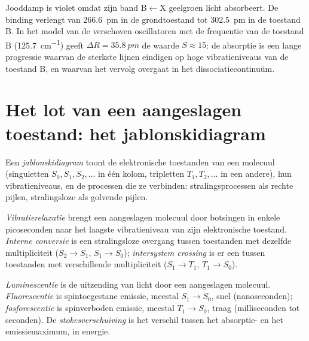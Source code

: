 \begin{example}[Jood]\label{ex:b3:electronic-spectroscopy:iodine}
Jooddamp is violet omdat zijn band B$\leftarrow$X geelgroen licht absorbeert.
De binding verlengt van \qty{266.6}{pm} in de grondtoestand tot \qty{302.5}{pm} in
de toestand B. In het model van de verschoven oscillatoren met de
frequentie van de toestand B
(\qty{125.7}{cm^{-1}}) geeft $\Delta R = \qty{35.8}{pm}$ de waarde $S \approx 15$: de absorptie is een
lange progressie waarvan de sterkste lijnen eindigen op hoge
vibratieniveaus van de toestand B, en waarvan het vervolg overgaat in het
dissociatiecontinuüm.
\end{example}

\section{Het lot van een aangeslagen toestand: het jablonskidiagram}

\begin{definition}[Jablonskidiagram]\label{def:b3:electronic-spectroscopy:jablonski}
Een \emph{jablonskidiagram} toont de elektronische
toestanden van een molecuul (singuletten $S_0, S_1, S_2, \dots$ in één kolom,
tripletten $T_1, T_2,
\dots$ in een andere), hun vibratieniveaus, en de processen die ze
verbinden: stralingsprocessen als rechte pijlen, stralingsloze als
golvende pijlen.
\end{definition}

\begin{definition}\label{def:b3:electronic-spectroscopy:radiationless}
\emph{Vibratierelaxatie} brengt een aangeslagen
molecuul door botsingen in enkele picoseconden naar het laagste
vibratieniveau van zijn elektronische toestand.
\emph{Interne conversie}
is een stralingsloze overgang tussen toestanden met dezelfde
multipliciteit ($S_2 \to S_1$, $S_1 \to S_0$); \emph{intersystem
crossing} is er een tussen toestanden met
verschillende multipliciteit ($S_1 \to T_1$, $T_1 \to S_0$).
\end{definition}

\begin{definition}\label{def:b3:electronic-spectroscopy:luminescence}
\emph{Luminescentie} is de uitzending van licht door
een aangeslagen molecuul. \emph{Fluorescentie} is
spintoegestane emissie, meestal $S_1 \to S_0$, snel (nanoseconden);
\emph{fosforescentie}
is spinverboden emissie, meestal $T_1 \to S_0$, traag (milliseconden tot
seconden). De \emph{stokesverschuiving} is het
verschil tussen het absorptie- en het emissiemaximum, in energie.
\end{definition}

